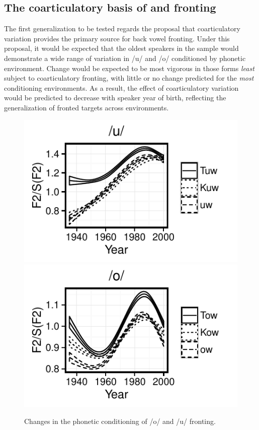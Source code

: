 \documentclass[12pt]{article}
\begin{document}
\subsection{The coarticulatory basis of  and  fronting}

The first generalization to be tested regards the proposal that coarticulatory variation provides the primary source for back vowel fronting. Under this proposal, it would be expected that the oldest speakers in the sample would demonstrate a wide range of variation in /u/ and /o/ conditioned by phonetic environment. Change would be expected to be most vigorous in those forms \textit{least} subject to coarticulatory fronting, with little or no change predicted for the \textit{most} conditioning environments. As a result, the effect of coarticulatory variation would be predicted to decrease with speaker year of birth, reflecting the generalization of fronted targets across environments. 
\begin{figure}[!htbp]
\includegraphics{uwphoneticconditioning}
\includegraphics{owphoneticconditioning}
\caption{Changes in the phonetic conditioning of /o/ and /u/ fronting.}
\end{figure}
\end{document}
